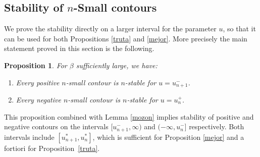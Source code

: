 \documentclass[JEP,XML,SOM,Unicode, NoFloatCountersInSection]{cedram}
\newenvironment{enumeratei}
{\bgroup\def\theenumi{\roman{enumi}}\def\theenumii{\Alph{enumii}}\begin{enumerate}}
{\end{enumerate}\egroup}
\numberwithin{equation}{section}
\theoremstyle{plain}
\newtheorem{proposition}[theorem]{Proposition}
\theoremstyle{definition}
\newcommand{\gb}{\beta}
\begin{document}
\subsection{Stability of $n$-Small contours}\label{smallcproof}

We prove the stability directly on a larger interval for the parameter $u$, so that it can be used for both Propositions \ref{truta} and \ref{mejor}.
More precisely the main statement proved in this section is the following.

\begin{proposition}\label{lesmall}
For $\gb$ sufficiently large, we have:
\begin{enumeratei}
\item
Every positive $n$-small contour is $n$-stable for $u=u^{-}_{n+1}$.
\item
Every negative $n$-small contour is $n$-stable for $u=u^{+}_n$.
\end{enumeratei}

\end{proposition}
This proposition combined with Lemma \ref{mozon} implies stability of positive and negative contours on the intervals $[u^{-}_{n+1},\infty)$ and
$(-\infty,u^{-}_{n}]$ respectively.
Both intervals include $[u^*_{n+1},u^*_n]$, which is sufficient
for Proposition \ref{mejor} and a fortiori for Proposition~\ref{truta}.
\end{document}
